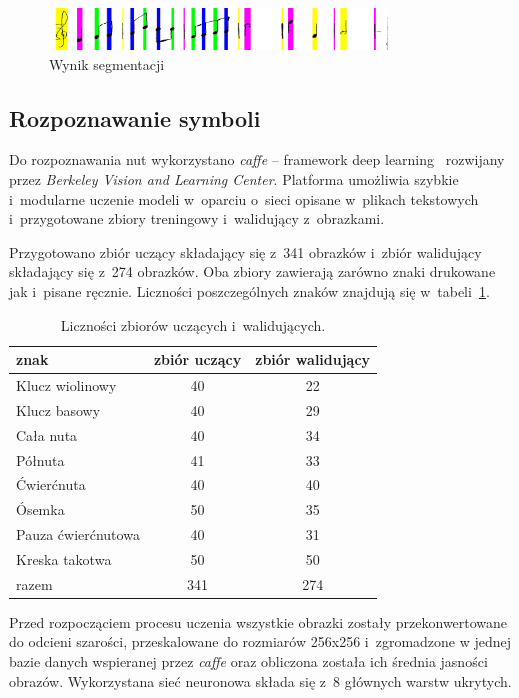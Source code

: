 \documentclass[a4paper,11pt]{article}
\begin{document}
\begin{figure}
\centering
\includegraphics[width=0.8\textwidth]{argb.jpg}
\caption{Wynik segmentacji}
\label{fig:argb}
\end{figure}


\subsection{Rozpoznawanie symboli}

Do rozpoznawania nut wykorzystano \emph{caffe} -- framework deep learning~\cite{jia2014caffe} rozwijany przez \emph{Berkeley Vision and Learning Center}. Platforma umożliwia szybkie i~modularne uczenie modeli w~oparciu o~sieci opisane w~plikach tekstowych i~przygotowane zbiory treningowy i~walidujący z~obrazkami.

Przygotowano zbiór uczący składający się z~341 obrazków i~zbiór walidujący składający się z~274 obrazków. Oba zbiory zawierają zarówno znaki drukowane jak i~pisane ręcznie. Liczności poszczególnych znaków znajdują się w~tabeli~\ref{tab:train_val}.

\begin{table}
\centering
\begin{tabular}{l|c|c}
znak & zbiór uczący & zbiór walidujący \\ \hline
Klucz wiolinowy & 40 & 22 \\
Klucz basowy & 40 & 29 \\
Cała nuta & 40 & 34 \\
Półnuta & 41 & 33 \\
Ćwierćnuta & 40 & 40 \\
Ósemka & 50 & 35 \\
Pauza ćwierćnutowa & 40 & 31 \\
Kreska takotwa & 50 & 50 \\ \hline
razem & 341 & 274 \\
\end{tabular}
\caption{Liczności zbiorów uczących i~walidujących.}
\label{tab:train_val}
\end{table}

Przed rozpocząciem procesu uczenia wszystkie obrazki zostały przekonwertowane do odcieni szarości, przeskalowane do rozmiarów 256x256 i~zgromadzone w jednej bazie danych wspieranej przez \emph{caffe} oraz obliczona została ich średnia jasności obrazów. Wykorzystana sieć neuronowa składa się z~8 głównych warstw ukrytych.
\end{document}
